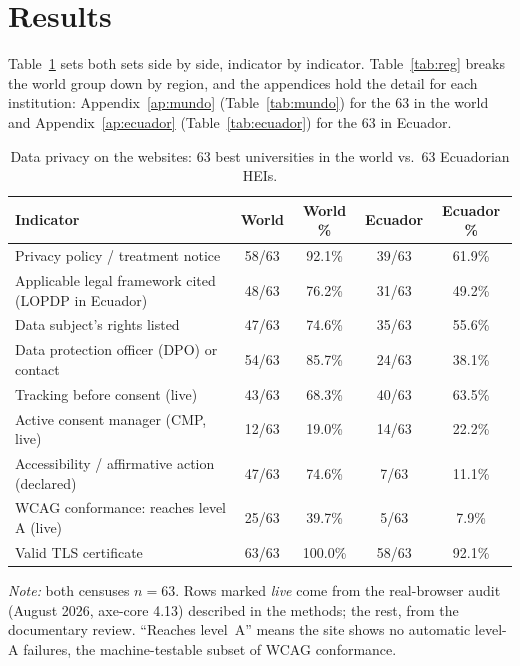\documentclass[pdflatex,sn-basic,Numbered]{sn-jnl}
\theoremstyle{thmstyleone}
\theoremstyle{thmstyletwo}
\theoremstyle{thmstylethree}
\begin{document}
\section{Results}\label{sec:resultados}
Table~\ref{tab:comp} sets both sets side by side, indicator by indicator. Table~\ref{tab:reg} breaks the world group down by region, and the appendices hold the detail for each institution: Appendix~\ref{ap:mundo} (Table~\ref{tab:mundo}) for the 63 in the world and Appendix~\ref{ap:ecuador} (Table~\ref{tab:ecuador}) for the 63 in Ecuador.

\begin{table}[htbp]
	\centering
	\caption{Data privacy on the websites: 63 best universities in the world vs.\ 63 Ecuadorian HEIs.}\label{tab:comp}
	\small
	\begin{tabular}{@{}p{7.2cm}cccc@{}}
		\toprule
		\textbf{Indicator} & \textbf{World} & \textbf{World \%} & \textbf{Ecuador} & \textbf{Ecuador \%} \\
		\midrule
	Privacy policy / treatment notice & 58/63 & 92.1\% & 39/63 & 61.9\% \\
	Applicable legal framework cited (LOPDP in Ecuador) & 48/63 & 76.2\% & 31/63 & 49.2\% \\
	Data subject's rights listed & 47/63 & 74.6\% & 35/63 & 55.6\% \\
	Data protection officer (DPO) or contact & 54/63 & 85.7\% & 24/63 & 38.1\% \\
	Tracking before consent (live) & 43/63 & 68.3\% & 40/63 & 63.5\% \\
	Active consent manager (CMP, live) & 12/63 & 19.0\% & 14/63 & 22.2\% \\
	Accessibility / affirmative action (declared) & 47/63 & 74.6\% & 7/63 & 11.1\% \\
	WCAG conformance: reaches level A (live) & 25/63 & 39.7\% & 5/63 & 7.9\% \\
	Valid TLS certificate & 63/63 & 100.0\% & 58/63 & 92.1\% \\
		\bottomrule
	\end{tabular}
	\par\vspace{2pt}
	\footnotesize\RaggedRight\textit{Note:} both censuses $n=63$. Rows marked \emph{live} come from the real-browser audit (August 2026, axe-core 4.13) described in the methods; the rest, from the documentary review. ``Reaches level~A'' means the site shows no automatic level-A failures, the machine-testable subset of WCAG conformance.
\end{table}
\end{document}
